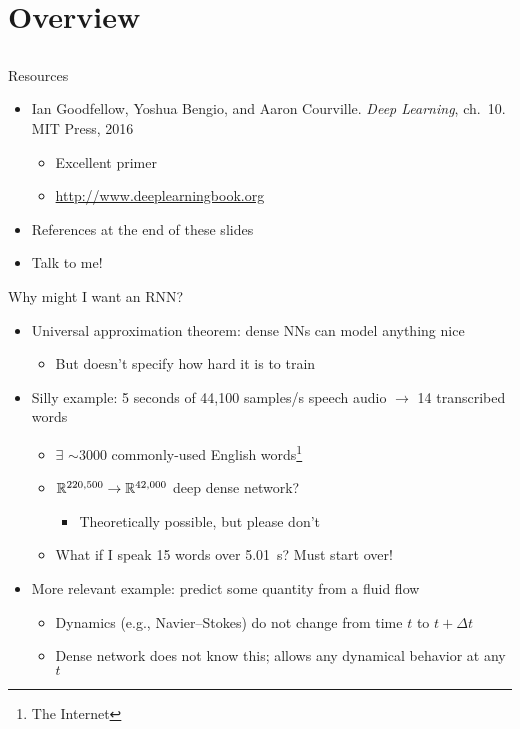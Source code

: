 \section{Overview}
\subsection{}

\begin{frame}{Resources}
    \begin{itemize}
        \item Ian Goodfellow, Yoshua Bengio, and Aaron Courville.
        \emph{Deep Learning}, ch.~10. MIT Press, 2016
        \nocite{GoodfellowDL}
        \begin{itemize}
            \item Excellent primer
            \item \textcolor{blue}{\url{http://www.deeplearningbook.org}}
        \end{itemize}
        \item References at the end of these slides
        \item Talk to me! \smiley
    \end{itemize}
\end{frame}

\begin{frame}{Why might I want an RNN?}
    \begin{itemize}
        \item<+-> Universal approximation theorem: dense NN{}s can model anything nice
        \begin{itemize}
            \item But doesn't specify how hard it is to train
        \end{itemize}
        \item<+-> Silly example: 5 seconds of 44,100 samples/s speech audio $\rightarrow$ 14 transcribed words
        \begin{itemize}
            \item $\exists$ $\sim$3000 commonly-used English words\footnote{The Internet}
            \item $\mathbb{R}^{220,500} \to \mathbb{R}^{42,000}$ deep dense network?
            \begin{itemize}
                \item Theoretically possible, but please don't
            \end{itemize}
            \item What if I speak 15 words over 5.01~s?
            Must start over!
        \end{itemize}
        \item<+-> More relevant example: predict some quantity from a fluid flow
        \begin{itemize}
            \item Dynamics (e.g., Navier--Stokes) do not change from time $t$ to $t + \Delta t$
            \item Dense network does not know this; allows any dynamical behavior at any $t$
        \end{itemize}
    \end{itemize}
\end{frame}

